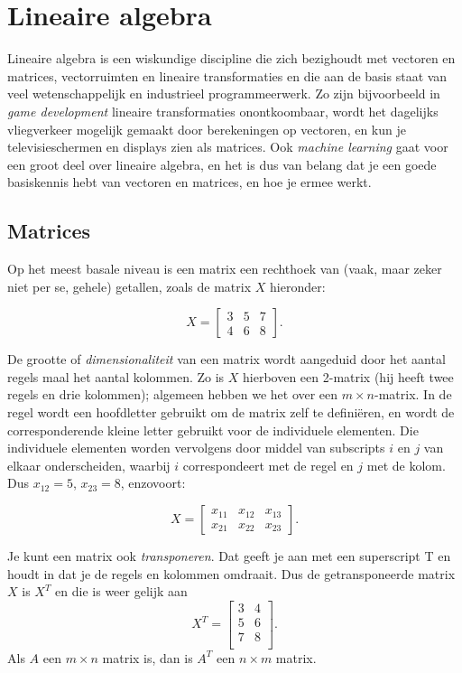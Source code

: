 
\section{Lineaire algebra}
Lineaire algebra is een wiskundige discipline die zich bezighoudt met vectoren en matrices, vectorruimten en lineaire transformaties en die aan de basis staat van veel wetenschappelijk en industrieel programmeerwerk. Zo zijn bijvoorbeeld in \textit{game development} lineaire transformaties onontkoombaar, wordt het dagelijks vliegverkeer mogelijk gemaakt door berekeningen op vectoren, en kun je televisieschermen en displays zien als matrices. Ook \textit{machine learning} gaat voor een groot deel over lineaire algebra, en het is dus van belang dat je een goede basiskennis hebt van vectoren en matrices, en hoe je ermee werkt.

\subsection{Matrices}
Op het meest basale niveau is een matrix een rechthoek van (vaak, maar zeker niet per se, gehele) getallen, zoals de matrix $X$ hieronder:

\[ 
X = \begin{bmatrix} 
3 & 5 & 7 \\
4 & 6 & 8
\end{bmatrix}.
\] 

De grootte of \textit{dimensionaliteit} van een matrix wordt aangeduid door het aantal regels maal het aantal kolommen. Zo is $X$ hierboven een 2-matrix (hij heeft twee regels en drie kolommen); algemeen hebben we het over een $m \times n$-matrix. In de regel wordt een hoofdletter gebruikt om de matrix zelf te definiëren, en wordt de corresponderende kleine letter gebruikt voor de individuele elementen. Die individuele elementen worden vervolgens door middel van subscripts $i$ en $j$ van elkaar onderscheiden, waarbij $i$ correspondeert met de regel en $j$ met de kolom. Dus $x_{12} = 5$, $x_{23} = 8$, enzovoort:

\[ 
X = \begin{bmatrix} 
x_{11} & x_{12} & x_{13} \\
x_{21} & x_{22} & x_{23}
\end{bmatrix}.
\] 

Je kunt een matrix ook \textit{transponeren}. Dat geeft je aan met een superscript T en houdt in dat je de regels en kolommen omdraait. Dus de getransponeerde matrix $X$ is $X^T$ en die is weer gelijk aan
%
\[ 
X^T = \begin{bmatrix} 
3 & 4 \\
5 & 6 \\
7 & 8 \\
\end{bmatrix}.
\] 
%
Als $A$ een $m \times n$ matrix is, dan is $A^T$ een $n \times m$ matrix.


